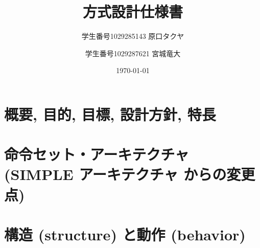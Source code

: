 \documentclass{jsreport}
\title{方式設計仕様書}
\author{学生番号1029285143 原口タクヤ \and 学生番号1029287621 宮城竜大}
\date{\today}
\begin{document}
\maketitle
\clearpage

\section{概要, 目的, 目標, 設計方針, 特長}

\section{命令セット・アーキテクチャ (SIMPLE アーキテクチャ からの変更点)}

\section{構造 (structure) と動作 (behavior)}
\end{document}
